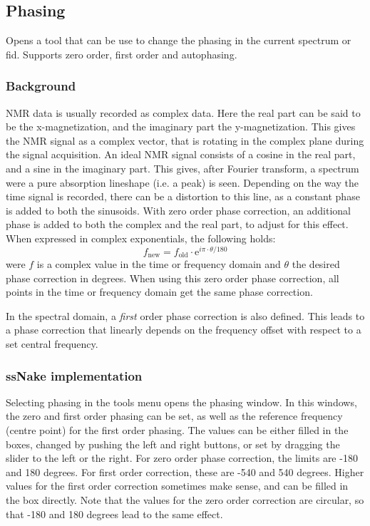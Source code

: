 \documentclass[11pt,a4paper]{article}
\begin{document}
\subsection{Phasing}
Opens a tool that can be use to change the phasing in the current spectrum or fid. Supports zero order, first order and autophasing.

\subsubsection*{Background}
NMR data is usually recorded as complex data. Here the real part can be said to be the x-magnetization, and the imaginary part the y-magnetization. This gives the NMR signal as a complex vector, that is rotating in the complex plane during the signal acquisition. An ideal NMR signal consists of a cosine in the real part, and a sine in the imaginary part. This gives, after Fourier transform, a spectrum were a pure absorption lineshape (i.e. a peak) is seen. Depending on the way the time signal is recorded, there can be a distortion to this line, as a constant phase is added to both the sinusoids. With zero order phase correction, an additional phase is added to both the complex and the real part, to adjust for this effect. When expressed in complex exponentials, the following holds:
\begin{equation}
f_\text{new} = f_\text{old}\cdot\text{e}^{i\pi\cdot\theta/180} 
\end{equation}
were $f$ is a complex value in the time or frequency domain and $\theta$ the desired phase correction in degrees. When using this zero order phase correction, all points in the time or frequency domain get the same phase correction.

In the spectral domain, a \textit{first} order phase correction is also defined. This leads to a phase correction that linearly depends on the frequency offset with respect to a set central frequency. 


\subsubsection*{ssNake implementation}
Selecting phasing in the tools menu opens the phasing window. In this windows, the zero and first order phasing can be set, as well as the reference frequency (centre point) for the first order phasing. The values can be either filled in the boxes,  changed by pushing the left and right buttons, or set by dragging the slider to the left or the right. For zero order phase correction, the limits are -180 and 180 degrees. For first order correction, these are -540 and 540 degrees. Higher values for the first order correction sometimes make sense, and can be filled in the box directly. Note that the values for the zero order correction are circular, so that -180 and 180 degrees lead to the same effect.
\end{document}
